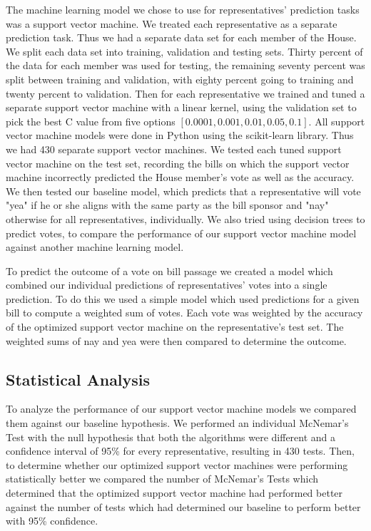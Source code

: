 \documentclass[11pt,letterpaper,twocolumn]{article}
\begin{document}
The machine learning model we chose to use for representatives' prediction tasks was a support vector machine. We treated each representative as a separate prediction task. Thus we had a separate data set for each member of the House. We split each data set into training, validation and testing sets. Thirty percent of the data for each member was used for testing, the remaining seventy percent was split between training and validation, with eighty percent going to training and twenty percent to validation. Then for each representative we trained and tuned a separate support vector machine with a linear kernel, using the validation set to pick the best C value from five options $[0.0001, 0.001, 0.01, 0.05, 0.1]$. All support vector machine models were done in Python using the scikit-learn library. Thus we had 430 separate support vector machines. We tested each tuned support vector machine on the test set, recording the bills on which the support vector machine incorrectly predicted the House member's vote as well as the accuracy. We then tested our baseline model, which predicts that a representative will vote "yea" if he or she aligns with the same party as the bill sponsor and "nay" otherwise for all representatives, individually. We also tried using decision trees to predict votes, to compare the performance of our support vector machine model against another machine learning model.

To predict the outcome of a vote on bill passage we created a model which combined our individual predictions of representatives' votes into a single prediction. To do this we used a simple model which used predictions for a given bill to compute a weighted sum of votes. Each vote was weighted by the accuracy of the optimized support vector machine on the representative's test set. The weighted sums of nay and yea were then compared to determine the outcome.

\subsection{Statistical Analysis}

To analyze the performance of our support vector machine models we compared them against our baseline hypothesis. We performed an individual McNemar's Test with the null hypothesis that both the algorithms were different and a confidence interval of 95\% for every representative, resulting in 430 tests. Then, to determine whether our optimized support vector machines were performing statistically better we compared the number of McNemar's Tests which determined that the optimized support vector machine had performed better against the number of tests which had determined our baseline to perform better with 95\% confidence.
\end{document}
